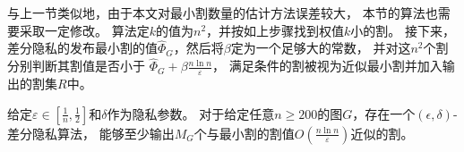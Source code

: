 与上一节类似地，由于本文对最小割数量的估计方法误差较大，
本节的算法也需要采取一定修改。
算法定$k$的值为$n^2$，并按如上步骤找到权值$k$小的割。
接下来，差分隐私的发布最小割的值$\hat \Phi_G$，然后将$\beta$定为一个足够大的常数，
并对这$n^2$个割分别判断其割值是否小于
$\hat \Phi_G+\beta \frac{n\ln n}{\varepsilon}$，
满足条件的割被视为近似最小割并加入输出的割集$R$中。
\begin{theorem}
    给定$\varepsilon\in[\frac 1n,\frac12]$和$\delta$作为隐私参数。
    对于给定任意$n\geq 200$的图$G$，存在一个$(\epsilon,\delta)$-差分隐私算法，
    能够至少输出$M_G$个与最小割的割值$O(\frac{n\ln n}{\varepsilon})$近似的割。
\end{theorem}